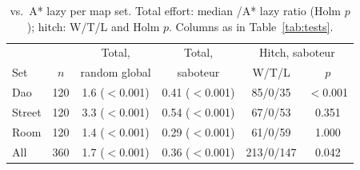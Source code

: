 \begin{table}[!t]
\centering
\footnotesize
\setlength{\tabcolsep}{3pt}
\caption{\dstar{} vs.\ A* lazy per map set. Total effort: median \dstar{}/A* lazy ratio (Holm $p$); hitch: W/T/L and Holm $p$. Columns as in Table~\ref{tab:tests}.}
\label{tab:sets}
\begin{tabular}{lccccc}
\toprule
 & & Total, & Total, & \multicolumn{2}{c}{Hitch, saboteur} \\
Set & $n$ & random global & saboteur & W/T/L & $p$ \\
\midrule
Dao & 120 & 1.6 ($<$0.001) & 0.41 ($<$0.001) & 85/0/35 & $<$0.001 \\
Street & 120 & 3.3 ($<$0.001) & 0.54 ($<$0.001) & 67/0/53 & 0.351 \\
Room & 120 & 1.4 ($<$0.001) & 0.29 ($<$0.001) & 61/0/59 & 1.000 \\
\midrule
All & 360 & 1.7 ($<$0.001) & 0.36 ($<$0.001) & 213/0/147 & 0.042 \\
\bottomrule
\end{tabular}
\end{table}
